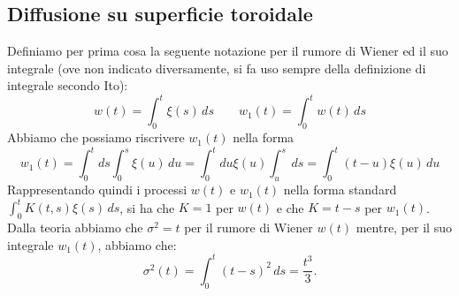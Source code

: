 \documentclass[10pt,a4paper]{article}
\begin{document}
\subsection{Diffusione su superficie toroidale}
\label{sec:diffusione_toro}
Definiamo per prima cosa la seguente notazione per il rumore di Wiener ed il suo integrale (ove non indicato diversamente, si fa uso sempre della definizione di integrale secondo Ito):
\begin{equation}
	w(t) = \int_0^t \xi(s)\,ds \quad\quad w_1(t)=\int_0^t w(t)\,ds
\end{equation}
Abbiamo che possiamo riscrivere $w_1(t)$ nella forma
\begin{equation}
	w_1(t) = \int_0^t ds\int_0^s \xi(u)\,du = \int_0^t du\xi(u)\int_u^s\,ds = \int_0^t (t-u)\xi(u)\,du
\end{equation}
Rappresentando quindi i processi $w(t)$ e $w_1(t)$ nella forma standard $\int_0^t K(t,s)\xi(s)\,ds$, si ha che $K=1$ per $w(t)$ e che $K=t-s$ per $w_1(t)$. Dalla teoria abbiamo che $\sigma^2 = t$ per il rumore di Wiener $w(t)$ mentre, per il suo integrale $w_1(t)$, abbiamo che:
\begin{equation}
	\sigma^2(t) = \int_0^t (t-s)^2\,ds = \frac{t^3}{3}.
\end{equation}
\end{document}
